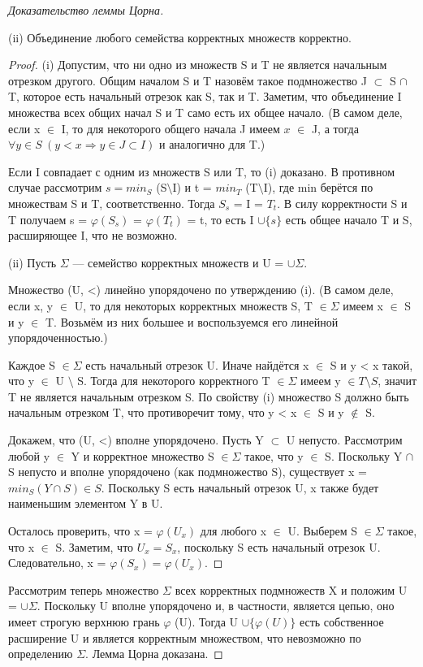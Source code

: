\begin{proof}[Доказательство леммы Цорна]
\begin{lemma}
(ii) Объединение любого семейства корректных множеств корректно.
\end{lemma}

\begin{proof}
(i) Допустим, что ни одно из множеств S и T не является начальным отрезком другого. Общим началом S и T назовём
	такое подмножество J $\subset$ S $\cap$ T,  которое есть начальный отрезок как S, так и T. Заметим, что
	объединение I множества всех общих начал S и T само есть их общее начало. (В самом деле, если x $\in$ I, то для
	некоторого общего начала J имеем $x$ $\in$ J, а тогда $\forall y \in S \ (y < x \Rightarrow y \in J \subset I)$
	и аналогично для T.)

Если I совпадает с одним из множеств S или T, то (i) доказано. В противном случае рассмотрим $s = min_S$
	(S$\setminus$I) и t = $min_T$ (T$\setminus$I), где min берётся по множествам S и T, соответственно. Тогда $S_s$
	= I = $T_t$. В силу корректности S и T получаем s = $\varphi (S_s)$ = $\varphi (T_t)$ = t, то есть I $\cup
	\{s\}$ есть общее начало T и S, расширяющее I, что не возможно.

(ii) Пусть $\Sigma$ — семейство корректных множеств и U = $\cup \Sigma$.

Множество (U, <) линейно упорядочено по утверждению (i). (В самом деле, если x, y $\in$ U, то для некоторых
	корректных множеств S, T $\in \Sigma$ имеем x $\in$ S и y $\in$ T. Возьмём из них большее и воспользуемся его
	линейной упорядоченностью.)

Каждое S $\in \Sigma$ есть начальный отрезок U. Иначе найдётся x $\in$ S и y < x такой, что y $\in$ U $\setminus$ S.
	Тогда для некоторого корректного T $\in \Sigma$ имеем y $\in T \setminus S$,  значит T не является начальным
	отрезком S. По свойству (i) множество S должно быть начальным отрезком T, что противоречит тому, что y < x
	$\in$ S и y $\notin$ S.

Докажем, что (U, <) вполне упорядочено. Пусть Y $\subset$ U непусто. Рассмотрим любой y $\in$ Y и корректное
	множество S $\in \Sigma$ такое, что y $\in$ S. Поскольку Y $\cap$ S непусто и вполне упорядочено (как
	подмножество S), существует x = $min_S (Y \cap S) \in S$. Поскольку S есть начальный отрезок U, x также будет
	наименьшим элементом Y в U.

Осталось проверить, что x = $\varphi (U_x)$ для любого x $\in$ U. Выберем S $\in \Sigma$ такое, что x $\in$ S.
	Заметим, что $U_x = S_x$, поскольку S есть начальный отрезок U. Следовательно, x = $\varphi (S_x) = \varphi
	(U_x)$.
\end{proof}

Рассмотрим теперь множество $\Sigma$ всех корректных подмножеств X и положим U = $\cup \Sigma$.  Поскольку U вполне
упорядочено и, в частности, является цепью, оно имеет строгую верхнюю грань $\varphi$ (U). Тогда U $\cup \{\varphi
(U) \}$ есть собственное расширение U и является корректным множеством, что невозможно по определению $\Sigma$. Лемма
Цорна доказана.
\end{proof}

